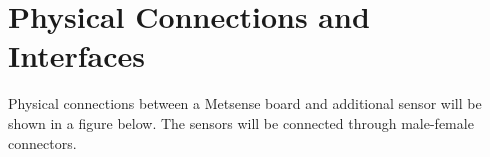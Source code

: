 \section{Physical Connections and Interfaces}

Physical connections between a Metsense board and additional sensor will be shown in a figure below.
The sensors will be connected through male-female connectors.
